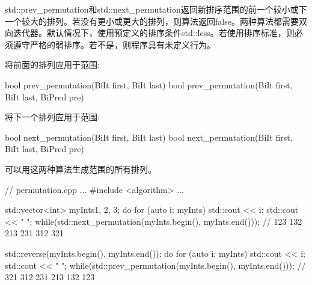 
std::prev\_permutation和std::next\_permutation返回新排序范围的前一个较小或下一个较大的排列。若没有更小或更大的排列，则算法返回false。两种算法都需要双向迭代器。默认情况下，使用预定义的排序条件std::less。若使用排序标准，则必须遵守严格的弱排序。若不是，则程序具有未定义行为。

将前面的排列应用于范围:

\begin{cpp}
bool prev_permutation(BiIt first, BiIt last)
bool prev_permutation(BiIt first, BiIt last, BiPred pre)
\end{cpp}

将下一个排列应用于范围:

\begin{cpp}
bool next_permutation(BiIt first, BiIt last)
bool next_permutation(BiIt first, BiIt last, BiPred pre)
\end{cpp}

可以用这两种算法生成范围的所有排列。


\begin{cpp}
// permutation.cpp
...
#include <algorithm>
...

std::vector<int> myInts{1, 2, 3};
do{
	for (auto i: myInts) std::cout << i;
	std::cout << " ";
} while(std::next_permutation(myInts.begin(), myInts.end()));
										// 123 132 213 231 312 321

std::reverse(myInts.begin(), myInts.end());
do{
	for (auto i: myInts) std::cout << i;
	std::cout << " ";
} while(std::prev_permutation(myInts.begin(), myInts.end()));
										// 321 312 231 213 132 123
\end{cpp}




















